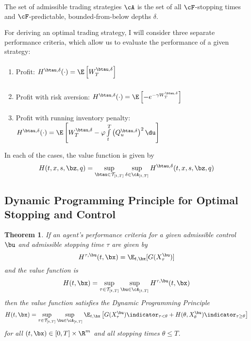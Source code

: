 \documentclass[12pt]{article}
\newtheorem{theorem}{Theorem}
\begin{document}
The set of admissible trading strategies $\cA$ is the set of all $\cF$-stopping times and $\cF$-predictable, bounded-from-below depths $\delta$. 

For deriving an optimal trading strategy, I will consider three separate performance criteria, which allow us to evaluate the performance of a given strategy:
\begin{enumerate}[noitemsep, topsep=0pt]
\item Profit: $H^{\btau, \delta}(\cdot) = \E \left[ W_T^{\btau, \delta} \right]\vphantom{\int\limits_t^T}$
\item Profit with risk aversion: $H^{\btau, \delta}(\cdot) = \E \left[ - e^{-\gamma W_T^{\btau, \delta}} \right] \vphantom{\int\limits_t^T}$
\item Profit with running inventory penalty: $H^{\btau, \delta}(\cdot) = \E \left[  W_T^{\btau, \delta}  - \varphi \int\limits_t^T \left( Q^{\btau, \delta}_u \right)^2 \du  \right]$
\end{enumerate}

In each of the cases, the value function is given by
\begin{equation}\label{eq:valuefunction}
H(t,x,s,\bz,q) = \sup\limits_{\btau \in \mathcal{T}_{[t,T]}} \sup\limits_{\delta \in \cA_{[t,T]}} H^{\btau, \delta}(t,x,s,\bz,q)
\end{equation}

\subsection*{Dynamic Programming Principle for Optimal Stopping and Control}
\begin{theorem}
If an agent's performance criteria for a given admissible control $\bu$ and admissible stopping time $\tau$ are given by
\[ H^{\tau, \bu}(t,\bx) = \E_{t,\bx} [ G (X^{\bu}_\tau)] \]
and the value function is
\[ H(t,\bx) = \sup\limits_{\tau \in \mathcal{T}_{[t,T]}} \sup\limits_{\bu \in \cA_{[t,T]}} H^{\tau, \bu}(t,\bx) \]
then the value function satisfies the Dynamic Programming Principle
\begin{equation}
\label{eq:thmDPP}
H(t,\bx) = \sup\limits_{\tau \in \mathcal{T}_{[t,T]}} \sup\limits_{\bu \in \cA_{[t,T]}} \E_{t,\bx} \left[ G (X^{\bu}_\tau) \indicator_{\tau<\theta} + H(\theta, X^{\bu}_\theta)\indicator_{\tau \geq \theta} \right]
\end{equation}
for all $(t,\bx) \in [0,T] \times \R^m$ and all stopping times $\theta \leq T$.
\end{theorem}
\end{document}
